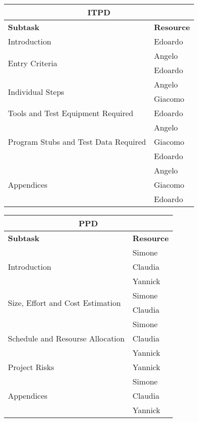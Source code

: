 \vspace* {30px}

\begin{center}
\begin{tabular}{ |l|l| }
	\multicolumn{2}{c}{\textbf{ITPD}} \\ \hline
	\textbf{Subtask} & \textbf{Resource} \\ \hline
	\multirow{1}{*}{Introduction} & Edoardo \\ \hline
	\multirow{2}{*}{Entry Criteria} & Angelo \\ 
									& Edoardo \\ \hline
	\multirow{2}{*}{Individual Steps} & Angelo \\
										& Giacomo \\ \hline
	\multirow{1}{*}{Tools and Test Equipment Required} & Edoardo \\ \hline
	\multirow{3}{*}{Program Stubs and Test Data Required} & Angelo \\ 
				& Giacomo \\
				& Edoardo \\ \hline
	\multirow{3}{*}{Appendices} & Angelo \\ 
				& Giacomo \\
				& Edoardo \\ \hline

\end{tabular}
\end{center}

\vspace* {30px}

\begin{center}
\begin{tabular}{ |l|l| }
	\multicolumn{2}{c}{\textbf{PPD}} \\ \hline
	\textbf{Subtask} & \textbf{Resource} \\ \hline
	\multirow{3}{*}{Introduction} & Simone \\ 
				& Claudia \\
				& Yannick \\ \hline
	\multirow{2}{*}{Size, Effort and Cost Estimation} & Simone \\ 
									& Claudia \\ \hline
	\multirow{3}{*}{Schedule and Resourse Allocation} & Simone \\ 
				& Claudia \\
				& Yannick \\ \hline
	\multirow{1}{*}{Project Risks} & Yannick \\ \hline
	\multirow{3}{*}{Appendices} & Simone \\ 
				& Claudia \\
				& Yannick \\ \hline

\end{tabular}
\end{center}


